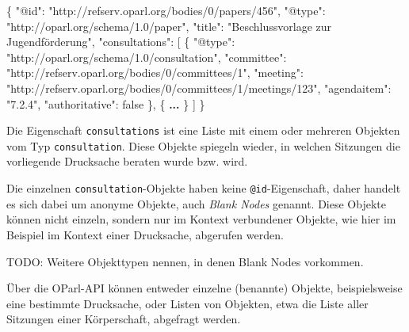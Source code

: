 \documentclass[,a4paper]{article}
\newenvironment{Shaded}{}{}
\newcommand{\DataTypeTok}[1]{\textcolor[rgb]{0.56,0.13,0.00}{{#1}}}
\newcommand{\DecValTok}[1]{\textcolor[rgb]{0.25,0.63,0.44}{{#1}}}
\newcommand{\StringTok}[1]{\textcolor[rgb]{0.25,0.44,0.63}{{#1}}}
\newcommand{\ErrorTok}[1]{\textcolor[rgb]{1.00,0.00,0.00}{\textbf{{#1}}}}
\newcommand{\NormalTok}[1]{{#1}}
\begin{document}
\begin{Shaded}
\begin{Highlighting}[]
\NormalTok{\{}
    \DataTypeTok{"@id"}\NormalTok{: }\StringTok{"http://refserv.oparl.org/bodies/0/papers/456"}\NormalTok{,}
    \DataTypeTok{"@type"}\NormalTok{: }\StringTok{"http://oparl.org/schema/1.0/paper"}\NormalTok{,}
    \DataTypeTok{"title"}\NormalTok{: }\StringTok{"Beschlussvorlage zur Jugendförderung"}\NormalTok{,}
    \DataTypeTok{"consultations"}\NormalTok{: [}
        \NormalTok{\{}
            \DataTypeTok{"@type"}\NormalTok{: }\StringTok{"http://oparl.org/schema/1.0/consultation"}\NormalTok{,}
            \DataTypeTok{"committee"}\NormalTok{: }\StringTok{"http://refserv.oparl.org/bodies/0/committees/1"}\NormalTok{,}
            \DataTypeTok{"meeting"}\NormalTok{: }\StringTok{"http://refserv.oparl.org/bodies/0/committees/1/meetings/123"}\NormalTok{,}
            \DataTypeTok{"agendaitem"}\NormalTok{: }\StringTok{"7.2.4"}\NormalTok{,}
            \DataTypeTok{"authoritative"}\NormalTok{: }\DecValTok{false}
        \NormalTok{\},}
        \NormalTok{\{}
            \ErrorTok{...}
        \NormalTok{\}}
    \NormalTok{]}
\NormalTok{\}}
\end{Highlighting}
\end{Shaded}

Die Eigenschaft \texttt{consultations} ist eine Liste mit einem oder
mehreren Objekten vom Typ \texttt{consultation}. Diese Objekte spiegeln
wieder, in welchen Sitzungen die vorliegende Drucksache beraten wurde
bzw. wird.

Die einzelnen \texttt{consultation}-Objekte haben keine
\texttt{@id}-Eigenschaft, daher handelt es sich dabei um anonyme
Objekte, auch \emph{Blank Nodes} genannt. Diese Objekte können nicht
einzeln, sondern nur im Kontext verbundener Objekte, wie hier im
Beispiel im Kontext einer Drucksache, abgerufen werden.

TODO: Weitere Objekttypen nennen, in denen Blank Nodes vorkommen.


Über die OParl-API können entweder einzelne (benannte) Objekte,
beispielsweise eine bestimmte Drucksache, oder Listen von Objekten, etwa
die Liste aller Sitzungen einer Körperschaft, abgefragt werden.
\end{document}
